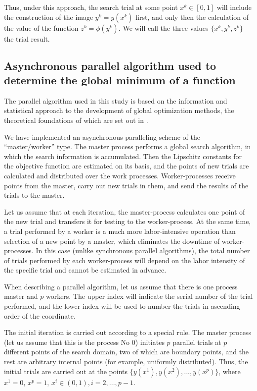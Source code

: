 \documentclass[mathematics,article,submit,pdftex,moreauthors]{Definitions/mdpi}
\begin{document}
Thus, under this approach, the search trial at some point $x^k\in[0,1]$ will include the construction of the image $y^k=y(x^k)$ first, and only then the calculation of the value of the function $ z^k = \phi(y^k)$.
We will call the three values $\{x^k,y ^k,z^k\}$ the trial result.

\subsection{Asynchronous parallel algorithm used to determine the global minimum of a function}

The parallel algorithm used in this study is based on the information and statistical approach to the development of global optimization methods, the theoretical foundations of which are set out in \cite{Strongin2000}. 

We have implemented an asynchronous paralleling scheme of the ``master/worker'' type. The master process performs a global search algorithm, in which the search information is accumulated. Then the Lipschitz constants for the objective function are estimated on its basis, and the points of new trials are calculated and distributed over the work processes. Worker-processes receive points from the master, carry out new trials in them, and send the results of the trials to the master. 

Let us assume that at each iteration, the master-process calculates one point of the new trial and transfers it for testing to the worker-process. At the same time, a trial performed by a worker is a much more labor-intensive operation than selection of a new point by a master, which eliminates the downtime of worker-processes. 
In this case (unlike synchronous parallel algorithms), the total number of trials performed by each worker-process  will depend on the labor intensity of the specific trial and cannot be estimated in advance.

When describing a parallel algorithm, let us assume that there is one process master and $p$ workers. The upper index will indicate the serial number of the trial performed, and the lower index will be used to number the trials in ascending order of the coordinate.
 
The initial iteration is carried out according to a special rule. The master process (let us assume that this is the process No 0) initiates  $p$ parallel trials at $p$ different points of the search domain, two of which are boundary points, and the rest are arbitrary internal points (for example, uniformly distributed). Thus, the initial trials are carried out at the points $\{y(x^1), y(x^2), ...,y(x^p)\}$, where $x^1 = 0$, $x^p = 1$, $x^i\in(0,1), i=2,..., p-1$.
\end{document}

